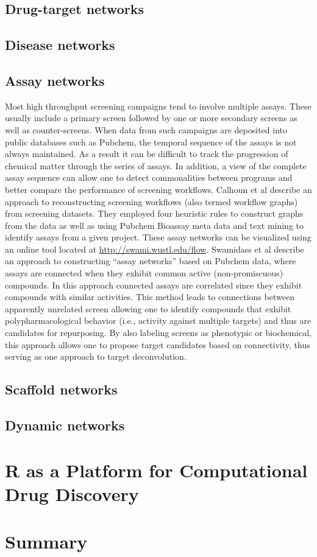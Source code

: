\documentclass[12pt,letterpaper]{article}
\begin{document}
\subsection{Drug-target networks}
\label{sec:drug-target-networks}


\subsection{Disease networks}
\label{sec:disease-networks}

\subsection{Assay networks}
\label{sec:assay-networks}

Most high throughput screening campaigns tend to involve multiple
assays. These usually include a primary screen followed by one or more
secondary screens as well as counter-screens. When data from such
campaigns are deposited into public databases such as Pubchem, the
temporal sequence of the assays is not always maintained. As a result
it can be difficult to track the progression of chemical matter
through the series of assays. In addition, a view of the complete
assay sequence can allow one to detect commonalities between programs
and better compare the performance of screening workflows. Calhoun et
al \cite{Calhoun:2012uq} describe an approach to reconstructing
screening workflows (also termed workflow graphs) from screening
datasets. They employed four heuristic rules to construct graphs from
the data as well as using Pubchem Bioassay meta data and text mining
to identify assays from a given project. These assay networks can be
visualized using an online tool located at
\href{http://swami.wustl.edu/flow}{http://swami.wustl.edu/flow}.
Swamidass et al \cite{Swamidass:2014vn} describe an approach to
constructing ``assay networks'' based on Pubchem data, where assays
are connected when they exhibit common active (non-promiscuous)
compounds. In this approach connected assays are correlated since they
exhibit compounds with similar activities. This method leads to
connections between apparently unrelated screen allowing one to
identify compounds that exhibit polypharmacological behavior (i.e.,
activity against multiple targets) and thus are candidates for
repurposing. By also labeling screens as phenotypic or biochemical,
this approach allows one to propose target candidates based on
connectivity, thus serving as one approach to target deconvolution.

\subsection{Scaffold networks}
\label{sec:scaffold-networks}


\subsection{Dynamic networks}
\label{sec:dynamic-networks}


\section{R as a Platform for Computational Drug Discovery}
\label{sec:r-as-platform}

\section{Summary}
\label{sec:summary}


\end{document}
